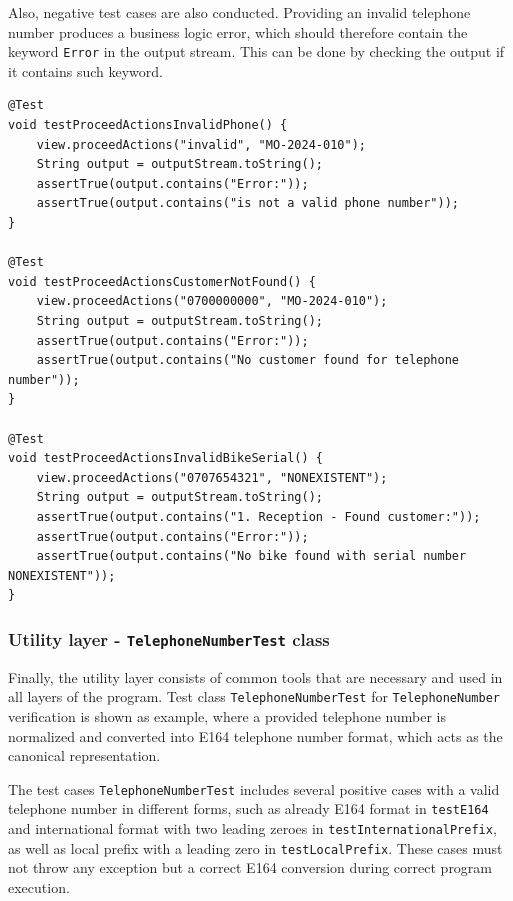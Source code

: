 \documentclass[a4paper]{scrartcl}
\begin{document}
Also, negative test cases are also conducted. Providing an invalid telephone number produces a business logic error, which should therefore contain the keyword \texttt{Error} in the output stream. This can be done by checking the output if it contains such keyword.

\begin{lstlisting}[style=javastyle, caption={Negative tests verifying error output for invalid input scenarios in \texttt{ViewTest}}]
@Test
void testProceedActionsInvalidPhone() {
    view.proceedActions("invalid", "MO-2024-010");
    String output = outputStream.toString();
    assertTrue(output.contains("Error:"));
    assertTrue(output.contains("is not a valid phone number"));
}

@Test
void testProceedActionsCustomerNotFound() {
    view.proceedActions("0700000000", "MO-2024-010");
    String output = outputStream.toString();
    assertTrue(output.contains("Error:"));
    assertTrue(output.contains("No customer found for telephone number"));
}

@Test
void testProceedActionsInvalidBikeSerial() {
    view.proceedActions("0707654321", "NONEXISTENT");
    String output = outputStream.toString();
    assertTrue(output.contains("1. Reception - Found customer:"));
    assertTrue(output.contains("Error:"));
    assertTrue(output.contains("No bike found with serial number NONEXISTENT"));
}
\end{lstlisting}

\subsubsection{Utility layer - \texttt{TelephoneNumberTest} class}

Finally, the utility layer consists of common tools that are necessary and used in all layers of the program. Test class \texttt{TelephoneNumberTest} for \texttt{TelephoneNumber} verification is shown as example, where a provided telephone number is normalized and converted into E164 telephone number format, which acts as the canonical representation.

The test cases \texttt{TelephoneNumberTest} includes several positive cases with a valid telephone number in different forms, such as already E164 format in \texttt{testE164} and international format with two leading zeroes in \texttt{testInternationalPrefix}, as well as local prefix with a leading zero in \texttt{testLocalPrefix}. These cases must not throw any exception but a correct E164 conversion during correct program execution.
\end{document}
